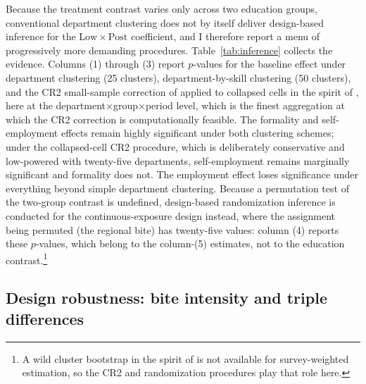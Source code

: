 Because the treatment contrast varies only across two education groups, conventional department clustering does not by itself deliver design-based inference for the $\mathrm{Low}\times\mathrm{Post}$ coefficient, and I therefore report a menu of progressively more demanding procedures. Table~\ref{tab:inference} collects the evidence. Columns (1) through (3) report $p$-values for the baseline effect under department clustering (25 clusters), department-by-skill clustering (50 clusters), and the CR2 small-sample correction of \citet{pustejovsky_tipton_2018} applied to collapsed cells in the spirit of \citet{bertrand_2004}, here at the department$\times$group$\times$period level, which is the finest aggregation at which the CR2 correction is computationally feasible. The formality and self-employment effects remain highly significant under both clustering schemes; under the collapsed-cell CR2 procedure, which is deliberately conservative and low-powered with twenty-five departments, self-employment remains marginally significant and formality does not. The employment effect loses significance under everything beyond simple department clustering. Because a permutation test of the two-group contrast is undefined, design-based randomization inference is conducted for the continuous-exposure design instead, where the assignment being permuted (the regional bite) has twenty-five values: column (4) reports these $p$-values, which belong to the column-(5) estimates, not to the education contrast.\footnote{A wild cluster bootstrap in the spirit of \citet{cameron_2008_bootstrap} is not available for survey-weighted estimation, so the CR2 and randomization procedures play that role here.}



\subsection{Design robustness: bite intensity and triple differences}

